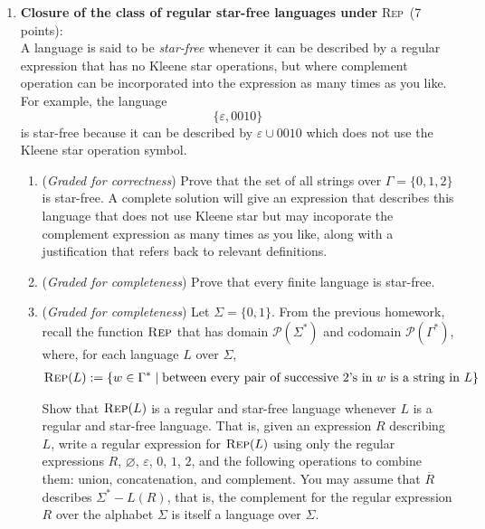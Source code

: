 \documentclass[12pt, oneside]{article}
\newcommand{\gradeCorrect}{({\it Graded for correctness}) }
\newcommand{\gradeComplete}{({\it Graded for completeness}) }
\newcommand{\REP}{\textsc{Rep}}
\begin{document}
\begin{enumerate}
\item {\bf Closure of the class of regular star-free languages under} \REP~(7 points):\\
A language is said to be \emph{star-free} whenever it can be described by a regular expression that 
has no Kleene star operations, but where complement operation can be 
incorporated into the expression as many times as you like. 
For example, the language $$\{\varepsilon, 0010\}$$ is star-free because it can be described
by $\varepsilon \cup 0010$ which does not use the Kleene star operation symbol.
\begin{enumerate}
    \item\gradeCorrect Prove that the set of all strings 
    over $\Gamma = \{0,1,2\}$ is star-free. A complete solution
    will give an expression that describes this language 
    that does not use Kleene star but may incoporate the complement
    expression as many times as you like, along 
    with a justification that refers back to relevant definitions.
    \item\gradeComplete Prove that every finite language is star-free.
    \item\gradeComplete Let $\Sigma = \{0,1\}$. From the previous
    homework, recall the function $\REP$ that has domain 
    $\mathcal{P}(\Sigma^*)$ and codomain $\mathcal{P}(\Gamma^*)$, 
    where, for each language $L$ over $\Sigma$,
    \begin{align*}
        \REP(L) &:= \{ w \in \Gamma^* \mid \text{between every 
    pair of successive $2$'s in $w$ is a string in $L$}\}
    \end{align*}
    
    Show that $\REP(L)$ is a regular and star-free language 
    whenever $L$ is a regular and star-free language. That is, 
    given an expression $R$ describing $L$, write a regular 
    expression for $\REP(L)$ using only the regular expressions 
    $R$, $\varnothing$, $\varepsilon$, $0$, $1$, $2$, and the 
    following operations to combine them: union, concatenation, 
    and complement. You may assume that $\overline{R}$
    describes $\Sigma^* -L(R)$, that is, the complement for the regular expression $R$ over the alphabet $\Sigma$ is itself 
    a language over $\Sigma$. 
\end{enumerate}

\end{enumerate}
\end{document}
